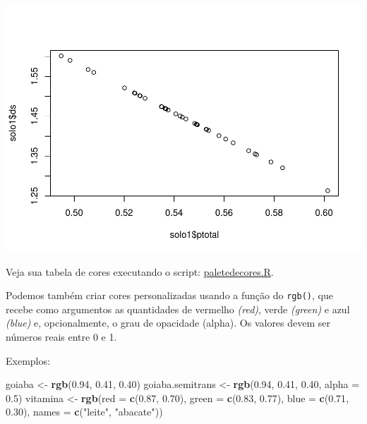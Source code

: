 \documentclass[
]{book}
\newenvironment{Shaded}{\begin{snugshade}}{\end{snugshade}}
\newcommand{\DataTypeTok}[1]{\textcolor[rgb]{0.13,0.29,0.53}{#1}}
\newcommand{\FloatTok}[1]{\textcolor[rgb]{0.00,0.00,0.81}{#1}}
\newcommand{\KeywordTok}[1]{\textcolor[rgb]{0.13,0.29,0.53}{\textbf{#1}}}
\newcommand{\NormalTok}[1]{#1}
\newcommand{\StringTok}[1]{\textcolor[rgb]{0.31,0.60,0.02}{#1}}
\begin{document}
\includegraphics{TudodoR_files/figure-latex/unnamed-chunk-177-1.pdf}

Veja sua tabela de cores executando o script: \href{https://www.dropbox.com/s/e9a27z97buqjovz/paletadecores.R?dl=1}{paletedecores.R}.

Podemos também criar cores personalizadas usando a função do \texttt{rgb()}, que recebe como argumentos as quantidades de vermelho \emph{(red)}, verde \emph{(green)} e azul \emph{(blue)} e, opcionalmente, o grau de opacidade (alpha). Os valores devem ser números reais entre 0 e 1.

Exemplos:

\begin{Shaded}
\begin{Highlighting}[]
\NormalTok{goiaba <-}\StringTok{ }\KeywordTok{rgb}\NormalTok{(}\FloatTok{0.94}\NormalTok{, }\FloatTok{0.41}\NormalTok{, }\FloatTok{0.40}\NormalTok{)}
\NormalTok{goiaba.semitrans <-}\StringTok{ }\KeywordTok{rgb}\NormalTok{(}\FloatTok{0.94}\NormalTok{, }\FloatTok{0.41}\NormalTok{, }\FloatTok{0.40}\NormalTok{, }\DataTypeTok{alpha =} \FloatTok{0.5}\NormalTok{)}
\NormalTok{vitamina <-}\StringTok{ }\KeywordTok{rgb}\NormalTok{(}\DataTypeTok{red =} \KeywordTok{c}\NormalTok{(}\FloatTok{0.87}\NormalTok{, }\FloatTok{0.70}\NormalTok{), }\DataTypeTok{green =} \KeywordTok{c}\NormalTok{(}\FloatTok{0.83}\NormalTok{, }\FloatTok{0.77}\NormalTok{),}
\DataTypeTok{blue =} \KeywordTok{c}\NormalTok{(}\FloatTok{0.71}\NormalTok{, }\FloatTok{0.30}\NormalTok{), }\DataTypeTok{names =} \KeywordTok{c}\NormalTok{(}\StringTok{"leite"}\NormalTok{, }\StringTok{"abacate"}\NormalTok{))}
\end{Highlighting}
\end{Shaded}
\end{document}
